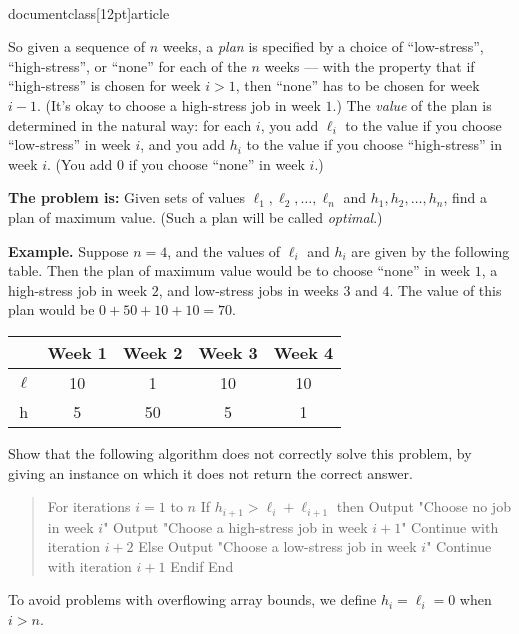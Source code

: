\\documentclass[12pt]{article}
\begin{document}
\begin{enumerate}
So given a sequence of $n$ weeks, a {\em plan} is
specified by a choice of ``low-stress'', ``high-stress'',
or ``none'' for each of the $n$ weeks --- with
the property that if ``high-stress'' is chosen for week $i > 1$,
then ``none'' has to be chosen for week $i-1$.
(It's okay to choose a high-stress job in week $1$.)
The {\em value} of the plan is determined in the natural way:
for each $i$, you add $\ell_i$ to the value if you
choose ``low-stress'' in week $i$,
and you add $h_i$ to the value if you
choose ``high-stress'' in week $i$.
(You add $0$ if you choose ``none'' in week $i$.)

{\bf The problem is:} Given sets of values
$\ell_1, \ell_2, \ldots, \ell_n$ and $h_1, h_2, \ldots, h_n$,
find a plan of maximum value.
(Such a plan will be called {\em optimal}.)

\bigskip
{\bf Example.}  Suppose $n = 4$, and the values of $\ell_i$ and $h_i$
are given by the following table.
Then the plan of maximum value would be to choose
``none'' in week $1$, a high-stress job in week $2$,
and low-stress jobs in weeks $3$ and $4$.
The value of this plan would be $0 + 50 + 10 + 10 = 70$.
\begin{table}[h]
\begin{center}
\begin{tabular}{|c||c|c|c|c|}
\hline & Week 1 & Week 2 & Week 3 & Week 4 \\ \hline
$\ell$ & 10 & 1 & 10 & 10 \\ \hline
h & 5 & 50 & 5 & 1 \\ \hline
\end{tabular}
\end{center}
\end{table}


Show that the following algorithm does not
correctly solve this problem, by giving an instance on which
it does not return the correct answer.
\begin{quote}
\begin{code}
For iterations $i = 1$ to $n$
  If $h_{i+1} > \ell_i + \ell_{i+1}$ then
    Output "Choose no job in week $i$"
    Output "Choose a high-stress job in week $i+1$"
    Continue with iteration $i+2$
  Else
    Output "Choose a low-stress job in week $i$"
    Continue with iteration $i+1$
  Endif
End
\end{code}
\end{quote}
To avoid problems with overflowing array bounds,
we define $h_i = \ell_i = 0$ when $i > n$.


\end{enumerate}
\end{document}
